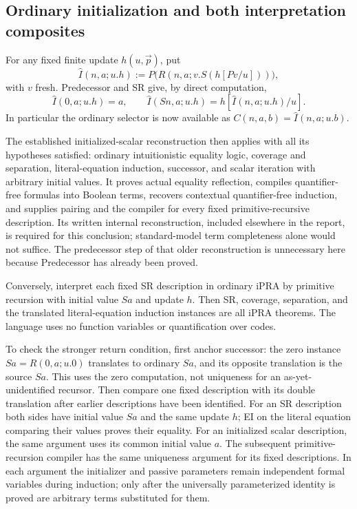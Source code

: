 \subsection{Ordinary initialization and both interpretation composites}

For any fixed finite update $h(u,\vec p)$, put
\[
 \widehat I(n,a;u.h)
 :=P\bigl(R(n,a;v.S(h[Pv/u]))\bigr),
 \tag{I}\label{eq:sr-initializer-compiler}
\]
with $v$ fresh.  Predecessor and SR give, by direct computation,
\[
 \widehat I(0,a;u.h)=a,\qquad
 \widehat I(Sn,a;u.h)=h[\widehat I(n,a;u.h)/u].
\]
In particular the ordinary selector is now available as
$C(n,a,b)=\widehat I(n,a;u.b)$.

The established initialized-scalar reconstruction then applies with
all its hypotheses satisfied: ordinary intuitionistic equality logic,
coverage and separation, literal-equation induction, successor, and
scalar iteration with arbitrary initial values.  It proves actual
equality reflection, compiles quantifier-free formulas into Boolean
terms, recovers contextual quantifier-free induction, and supplies
pairing and the compiler for every fixed primitive-recursive description.
Its written internal reconstruction, included elsewhere in the report,
is required for this conclusion; standard-model term completeness alone
would not suffice.  The predecessor step of that older reconstruction
is unnecessary here because Predecessor has already been proved.

Conversely, interpret each fixed SR description in ordinary iPRA by
primitive recursion with initial value $Sa$ and update $h$.  Then SR,
coverage, separation, and the translated literal-equation induction
instances are all iPRA theorems.  The language uses no function variables
or quantification over codes.

To check the stronger return condition, first anchor successor: the
zero instance $Sa=R(0,a;u.0)$ translates to ordinary $Sa$, and its
opposite translation is the source $Sa$. This uses the zero computation,
not uniqueness for an as-yet-unidentified recursor. Then compare one fixed description
with its double translation after earlier descriptions have been
identified.  For an SR description both sides have initial value $Sa$
and the same update $h$; EI on the literal equation comparing their
values proves their equality.  For an initialized scalar description,
the same argument uses its common initial value $a$.  The subsequent
primitive-recursion compiler has the same uniqueness argument for its
fixed descriptions.  In each argument the initializer and passive
parameters remain independent formal variables during induction; only
after the universally parameterized identity is proved are arbitrary
terms substituted for them.

